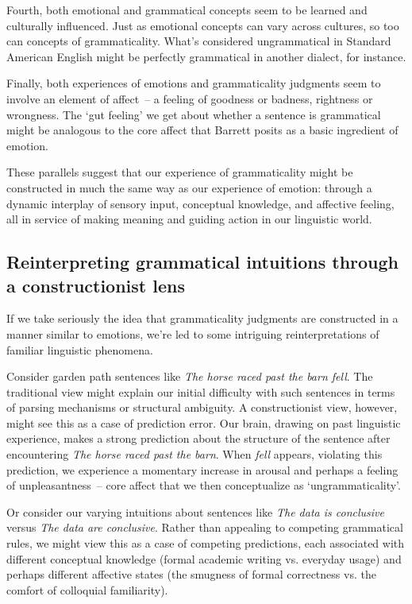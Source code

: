 Fourth, both emotional and grammatical concepts seem to be learned and culturally influenced. Just as emotional concepts can vary across cultures, so too can concepts of grammaticality. What's considered ungrammatical in Standard American English might be perfectly grammatical in another dialect, for instance.

Finally, both experiences of emotions and grammaticality judgments seem to involve an element of affect~-- a feeling of goodness or badness, rightness or wrongness. The `gut feeling' we get about whether a sentence is grammatical might be analogous to the core affect that Barrett posits as a basic ingredient of emotion.

These parallels suggest that our experience of grammaticality might be constructed in much the same way as our experience of emotion: through a dynamic interplay of sensory input, conceptual knowledge, and affective feeling, all in service of making meaning and guiding action in our linguistic world.

\subsection{Reinterpreting grammatical intuitions through a constructionist lens}

If we take seriously the idea that grammaticality judgments are constructed in a manner similar to emotions, we're led to some intriguing reinterpretations of familiar linguistic phenomena.

Consider garden path sentences like \textit{The horse raced past the barn fell}. The traditional view might explain our initial difficulty with such sentences in terms of parsing mechanisms or structural ambiguity. A constructionist view, however, might see this as a case of prediction error. Our brain, drawing on past linguistic experience, makes a strong prediction about the structure of the sentence after encountering \textit{The horse raced past the barn}. When \textit{fell} appears, violating this prediction, we experience a momentary increase in arousal and perhaps a feeling of unpleasantness~-- core affect that we then conceptualize as `ungrammaticality'.

Or consider our varying intuitions about sentences like \textit{The data is conclusive} versus \textit{The data are conclusive}. Rather than appealing to competing grammatical rules, we might view this as a case of competing predictions, each associated with different conceptual knowledge (formal academic writing vs. everyday usage) and perhaps different affective states (the smugness of formal correctness vs. the comfort of colloquial familiarity).

